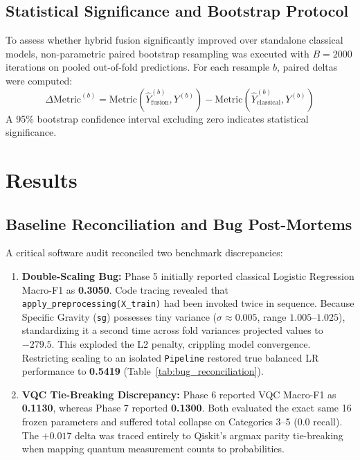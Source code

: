 \documentclass[10pt,conference]{IEEEtran}
\begin{document}
\subsection{Statistical Significance and Bootstrap Protocol}
To assess whether hybrid fusion significantly improved over standalone classical models, non-parametric paired bootstrap resampling was executed with $B = 2000$ iterations on pooled out-of-fold predictions. For each resample $b$, paired deltas were computed:
\begin{equation}
\Delta\text{Metric}^{(b)} = \text{Metric}(\hat{Y}_{\text{fusion}}^{(b)}, Y^{(b)}) - \text{Metric}(\hat{Y}_{\text{classical}}^{(b)}, Y^{(b)})
\end{equation}
A 95\% bootstrap confidence interval excluding zero indicates statistical significance.

\section{Results}
\subsection{Baseline Reconciliation and Bug Post-Mortems}
A critical software audit reconciled two benchmark discrepancies:
\begin{enumerate}
    \item \textbf{Double-Scaling Bug:} Phase 5 initially reported classical Logistic Regression Macro-F1 as \textbf{0.3050}. Code tracing revealed that \texttt{apply\_preprocessing(X\_train)} had been invoked twice in sequence. Because Specific Gravity (\texttt{sg}) possesses tiny variance ($\sigma \approx 0.005$, range $1.005$--$1.025$), standardizing it a second time across fold variances projected values to \textbf{$-279.5$}. This exploded the L2 penalty, crippling model convergence. Restricting scaling to an isolated \texttt{Pipeline} restored true balanced LR performance to \textbf{0.5419} (Table~\ref{tab:bug_reconciliation}).
    \item \textbf{VQC Tie-Breaking Discrepancy:} Phase 6 reported VQC Macro-F1 as \textbf{0.1130}, whereas Phase 7 reported \textbf{0.1300}. Both evaluated the exact same 16 frozen parameters and suffered total collapse on Categories 3--5 (0.0 recall). The $+0.017$ delta was traced entirely to Qiskit's argmax parity tie-breaking when mapping quantum measurement counts to probabilities.
\end{enumerate}
\end{document}
